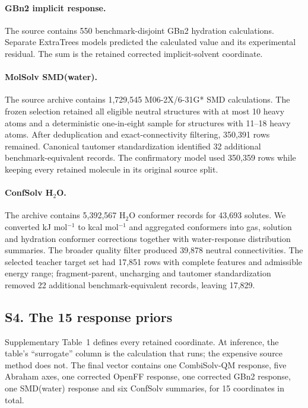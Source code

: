 \documentclass[10pt]{article}
\begin{document}
\paragraph{GBn2 implicit response.}
The source contains 550 benchmark-disjoint GBn2 hydration calculations. Separate
ExtraTrees models predicted the calculated value and its experimental residual. The
sum is the retained corrected implicit-solvent coordinate.

\paragraph{MolSolv SMD(water).}
The source archive contains 1,729,545 M06-2X/6-31G* SMD calculations. The frozen
selection retained all eligible neutral structures with at most 10 heavy atoms and a
deterministic one-in-eight sample for structures with 11--18 heavy atoms. After
deduplication and exact-connectivity filtering, 350,391 rows remained. Canonical
tautomer standardization identified 32 additional benchmark-equivalent records. The
confirmatory model used 350,359 rows while keeping every retained molecule in its
original source split.

\paragraph{ConfSolv H$_2$O.}
The archive contains 5,392,567 H$_2$O conformer records for 43,693 solutes. We
converted kJ mol$^{-1}$ to kcal mol$^{-1}$ and aggregated conformers into gas,
solution and hydration conformer corrections together with water-response
distribution summaries. The broader quality filter produced 39,878 neutral
connectivities. The selected teacher target set had 17,851 rows with complete
features and admissible energy range; fragment-parent, uncharging and tautomer
standardization removed 22 additional benchmark-equivalent records, leaving 17,829.

\subsection*{S4. The 15 response priors}

Supplementary Table~1 defines every retained coordinate. At inference, the table's
``surrogate'' column is the calculation that runs; the expensive source method does
not. The final vector contains one CombiSolv-QM response, five Abraham axes, one
corrected OpenFF response, one corrected GBn2 response, one SMD(water) response and
six ConfSolv summaries, for 15 coordinates in total.
\end{document}
